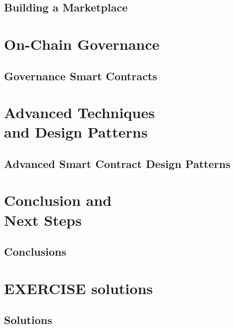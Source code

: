 \chapter{Building a Marketplace} \label{ch:Building a Marketplace}


\part{On-Chain Governance}
\newpage
\chapter{Governance Smart Contracts} \label{ch:Governance}


\part{Advanced Techniques \\ and Design Patterns}
\newpage
\chapter{Advanced Smart Contract Design Patterns} \label{ch:AdvancedPatterns}


\part{Conclusion and \\ Next Steps}
\newpage
\chapter{Conclusions} \label{ch:Conclusions}


\newpage
\part{EXERCISE solutions}
\chapter{Solutions}




\printglossary[title={Glossary}, type=main]



